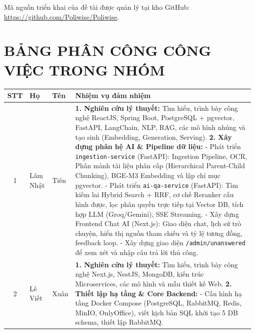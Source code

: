 \documentclass[12pt,a4paper]{report}
\begin{document}
Mã nguồn triển khai của đề tài được quản lý tại kho GitHub: \url{https://github.com/Poliwise/Poliwise}.

\clearpage

{}
\chapter*{BẢNG PHÂN CÔNG CÔNG VIỆC TRONG NHÓM}

\begin{table}[H]
\centering
\singlespacing
\small
\begin{tabularx}{\textwidth}{|c|l|l|X|}
\hline
\textbf{STT} & \textbf{Họ} & \textbf{Tên} & \textbf{Nhiệm vụ đảm nhiệm} \\ \hline
1 & Lâm Nhật & Tiên & 
\textbf{1. Nghiên cứu lý thuyết:} \newline
Tìm hiểu, trình bày công nghệ ReactJS, Spring Boot, PostgreSQL + pgvector, FastAPI, LangChain, NLP, RAG, các mô hình nhúng và tạo sinh (Embedding, Generation, Serving). \newline
\textbf{2. Xây dựng phân hệ AI \& Pipeline dữ liệu:} \newline
- Phát triển \texttt{ingestion-service} (FastAPI): Ingestion Pipeline, OCR, Phân mảnh tài liệu phân cấp (Hierarchical Parent-Child Chunking), BGE-M3 Embedding và lập chỉ mục pgvector. \newline
- Phát triển \texttt{ai-qa-service} (FastAPI): Tìm kiếm lai Hybrid Search + RRF, cơ chế Reranker cấu hình được, lọc phân quyền trực tiếp tại Vector DB, tích hợp LLM (Groq/Gemini), SSE Streaming. \newline
- Xây dựng Frontend Chat AI (Next.js): Giao diện chat, lịch sử trò chuyện, hiển thị nguồn tham chiếu và tỷ lệ tương đồng, feedback loop. \newline
- Xây dựng giao diện \texttt{/admin/unanswered} để xem xét và nhập câu trả lời thủ công.
\\ \hline
2 & Lê Viết & Xuân & 
\textbf{1. Nghiên cứu lý thuyết:} \newline
Tìm hiểu, trình bày công nghệ Next.js, NestJS, MongoDB, kiến trúc Microservices, các mô hình và mẫu thiết kế Web. \newline
\textbf{2. Thiết lập hạ tầng \& Core Backend:} \newline
- Cấu hình hạ tầng Docker Compose (PostgreSQL, RabbitMQ, Redis, MinIO, OnlyOffice), viết kịch bản SQL khởi tạo 5 DB schema, thiết lập RabbitMQ. \newline

\end{tabularx}
\end{table}
\end{document}
